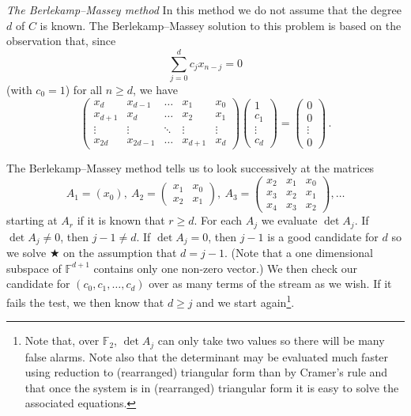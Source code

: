 \documentclass[12pt,a4paper]{article}
\theoremstyle{plain}
\theoremstyle{definition}
\begin{document}
\noindent\emph{The Berlekamp--Massey method}
In this method we do not assume that
the degree $d$ of $C$ is known.
The Berlekamp--Massey solution to this problem
is based on the observation that, since
\[\sum_{j=0}^{d}c_{j}x_{n-j}=0\]
(with $c_{0}=1$)
for all $n\geq d$, we have
\begin{equation*}
\begin{pmatrix}
x_{d}&x_{d-1}&\dots&x_{1}&x_{0}\\
x_{d+1}&x_{d}&\dots&x_{2}&x_{1}\\
\vdots&\vdots&\ddots&\vdots&\vdots\\
x_{2d}&x_{2d-1}&\dots&x_{d+1}&x_{d}
\end{pmatrix}
\begin{pmatrix}
1\\c_{1}\\ \vdots\\c_{d}
\end{pmatrix}
=\begin{pmatrix}
0\\0\\ \vdots\\0
\end{pmatrix}\,.
\tag*{$\bigstar$}
\end{equation*}

The Berlekamp--Massey method
tells us to look successively
at the matrices
\[A_{1}=(x_{0}),
\ A_{2}=
\begin{pmatrix}
x_{1}&x_{0}\\
x_{2}&x_{1}
\end{pmatrix},
\ A_{3}=
\begin{pmatrix}
x_{2}&x_{1}&x_{0}\\
x_{3}&x_{2}&x_{1}\\
x_{4}&x_{3}&x_{2}
\end{pmatrix},
\dots
\]
starting at $A_{r}$ if it is known that $r\geq d$.
For each $A_{j}$ we evaluate $\det A_{j}$.
If $\det A_{j}\neq 0$, then $j-1\neq d$.
If $\det A_{j}=0$, then $j-1$ is a good candidate
for $d$ so we solve $\bigstar$ on the assumption that
$d=j-1$. (Note that a one dimensional subspace of
${\mathbb F}^{d+1}$ contains only one non-zero
vector.) We then check our candidate for
$(c_{0},c_{1},\dots,c_{d})$ over as many
terms of the stream as we wish. If it fails the
test, we then know that $d\geq j$ and we start
again\footnote{Note that, over ${\mathbb F}_{2}$,
$\det A_{j}$ can only take two values so there will
be many false alarms. Note also that the determinant
may be evaluated much faster using reduction to
(rearranged) triangular form than by Cramer's rule
and that once the system is in (rearranged) triangular form
it is easy to solve the associated equations.}.
\end{document}
